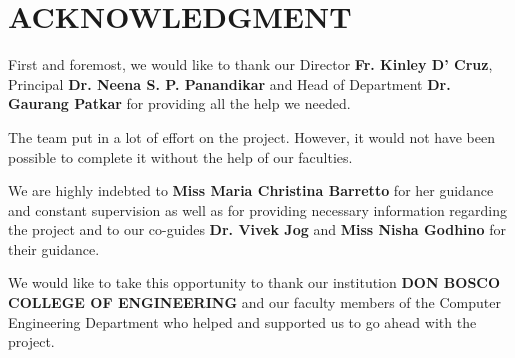 \chapter*{ACKNOWLEDGMENT}

First and foremost, we would like to thank our Director \textbf{Fr. Kinley D’ Cruz}, 
Principal \textbf{Dr. Neena S. P. Panandikar} and Head of Department \textbf{Dr. Gaurang Patkar} 
for providing all the help we needed.

The team put in a lot of effort on the project. However, it would not have 
been possible to complete it without the help of our faculties.

We are highly indebted to \textbf{Miss Maria Christina Barretto} for her guidance 
and constant supervision as well as for providing necessary information 
regarding the project and to our co-guides \textbf{Dr. Vivek Jog} and \textbf{Miss Nisha 
Godhino} for their guidance.

We would like to take this opportunity to thank our institution 
\textbf{DON BOSCO COLLEGE OF ENGINEERING} and our faculty members of the 
Computer Engineering Department who helped and supported us to 
go ahead with the project.

